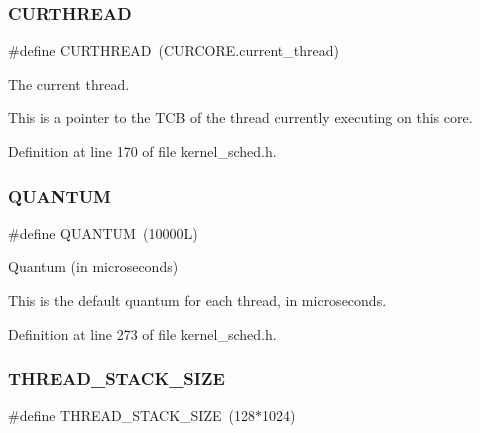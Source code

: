 \mbox{\label{group__scheduler_ga587a82c8931f0df72f43cc913ceb7e27}} 
\subsubsection{\texorpdfstring{C\+U\+R\+T\+H\+R\+E\+AD}{CURTHREAD}}
{\footnotesize\ttfamily \#define C\+U\+R\+T\+H\+R\+E\+AD~(C\+U\+R\+C\+O\+R\+E.\+current\+\_\+thread)}



The current thread. 

This is a pointer to the T\+CB of the thread currently executing on this core. 

Definition at line 170 of file kernel\+\_\+sched.\+h.

\mbox{\label{group__scheduler_gabc4f0f9abea1b5443308e4ea84b52b21}} 
\subsubsection{\texorpdfstring{Q\+U\+A\+N\+T\+UM}{QUANTUM}}
{\footnotesize\ttfamily \#define Q\+U\+A\+N\+T\+UM~(10000\+L)}



Quantum (in microseconds) 

This is the default quantum for each thread, in microseconds. 

Definition at line 273 of file kernel\+\_\+sched.\+h.

\mbox{\label{group__scheduler_ga90b7a8cb7bc3fdbd98014a3e15ee6e9a}} 
\subsubsection{\texorpdfstring{T\+H\+R\+E\+A\+D\+\_\+\+S\+T\+A\+C\+K\+\_\+\+S\+I\+ZE}{THREAD\_STACK\_SIZE}}
{\footnotesize\ttfamily \#define T\+H\+R\+E\+A\+D\+\_\+\+S\+T\+A\+C\+K\+\_\+\+S\+I\+ZE~(128$\ast$1024)}

